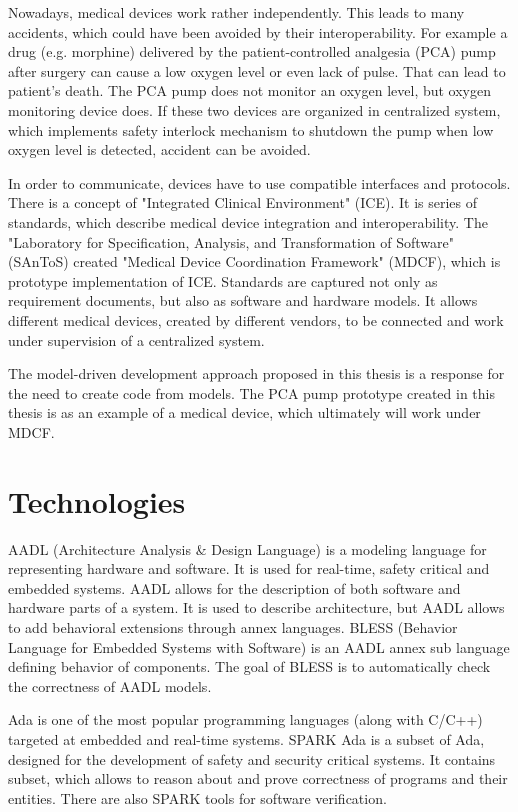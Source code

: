 Nowadays, medical devices work rather independently. This leads to many accidents, which could have been avoided by their interoperability. For example a drug (e.g. morphine) delivered by the patient-controlled analgesia (PCA) pump after surgery can cause a low oxygen level or even lack of pulse. That can lead to patient's death. The PCA pump does not monitor an oxygen level, but oxygen monitoring device does. If these two devices are organized in centralized system, which implements safety interlock mechanism to shutdown the pump when low oxygen level is detected, accident can be avoided. 

In order to communicate, devices have to use compatible interfaces and protocols. There is a concept of "Integrated Clinical Environment" (ICE). It is series of standards, which describe medical device integration and interoperability. The "Laboratory for Specification, Analysis, and Transformation of Software" (SAnToS) created "Medical Device Coordination Framework" (MDCF), which is prototype implementation of ICE. Standards are captured not only as requirement documents, but also as software and hardware models. It allows different medical devices, created by different vendors, to be connected and work under supervision of a centralized system.

The model-driven development approach proposed in this thesis is a response for the need to create code from models. The PCA pump prototype created in this thesis is as an example of a medical device, which ultimately will work under MDCF.


\section{Technologies}
\label{introduction:technologies}

AADL (Architecture Analysis \& Design Language) is a modeling language for representing hardware and software. It is used for real-time, safety critical and embedded systems. AADL allows for the description of both software and hardware parts of a system. It is used to describe architecture, but AADL allows to add behavioral extensions through annex languages. BLESS (Behavior Language for Embedded Systems with Software) is an AADL annex sub language defining behavior of components. The goal of BLESS is to automatically check the correctness of AADL models.

Ada is one of the most popular programming languages (along with C/C++) targeted at embedded and real-time systems. SPARK Ada is a subset of Ada, designed for the development of safety and security critical systems. It contains subset, which allows to reason about and prove correctness of programs and their entities. There are also SPARK tools for software verification.


